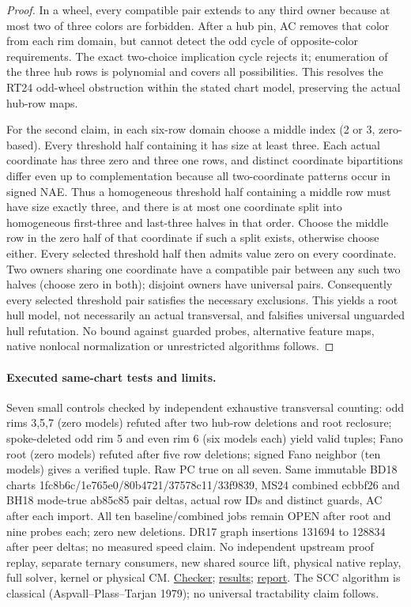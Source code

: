 \documentclass[11pt]{article}
\begin{document}
\begin{proof}
In a wheel, every compatible pair extends to any third owner because at most two of three colors are forbidden. After a hub pin, AC removes that color from each rim domain, but cannot detect the odd cycle of opposite-color requirements. The exact two-choice implication cycle rejects it; enumeration of the three hub rows is polynomial and covers all possibilities. This resolves the RT24 odd-wheel obstruction within the stated chart model, preserving the actual hub-row maps.

For the second claim, in each six-row domain choose a middle index (2 or 3, zero-based). Every threshold half containing it has size at least three. Each actual coordinate has three zero and three one rows, and distinct coordinate bipartitions differ even up to complementation because all two-coordinate patterns occur in signed NAE. Thus a homogeneous threshold half containing a middle row must have size exactly three, and there is at most one coordinate split into homogeneous first-three and last-three halves in that order. Choose the middle row in the zero half of that coordinate if such a split exists, otherwise choose either. Every selected threshold half then admits value zero on every coordinate. Two owners sharing one coordinate have a compatible pair between any such two halves (choose zero in both); disjoint owners have universal pairs. Consequently every selected threshold pair satisfies the necessary exclusions. This yields a root hull model, not necessarily an actual transversal, and falsifies universal unguarded hull refutation. No bound against guarded probes, alternative feature maps, native nonlocal normalization or unrestricted algorithms follows.
\end{proof}
\paragraph{Executed same-chart tests and limits.}
Seven small controls checked by independent exhaustive transversal counting: odd rims 3,5,7 (zero models) refuted after two hub-row deletions and root reclosure; spoke-deleted odd rim 5 and even rim 6 (six models each) yield valid tuples; Fano root (zero models) refuted after five row deletions; signed Fano neighbor (ten models) gives a verified tuple. Raw PC true on all seven. Same immutable BD18 charts 1fc8b6c/1e765e0/80b4721/37578c11/33f9839, MS24 combined ecbbf26 and BH18 mode-true ab85c85 pair deltas, actual row IDs and distinct guards, AC after each import. All ten baseline/combined jobs remain OPEN after root and nine probes each; zero new deletions. DR17 graph insertions 131694 to 128834 after peer deltas; no measured speed claim. No independent upstream proof replay, separate ternary consumers, new shared source lift, physical native replay, full solver, kernel or physical CM. \href{https://github.com/j15marti/pnp/commit/9ea727474b1f9b7948af8197bfcde69be8183969}{Checker}; \href{https://github.com/j15marti/pnp/commit/526075b8065e8676203744189d21f97aafdc211b}{results}; \href{https://github.com/j15marti/pnp/commit/2134c68704257432c9515b0917987e9257202870}{report}. The SCC algorithm is classical (Aspvall--Plass--Tarjan 1979); no universal tractability claim follows.
\end{document}

